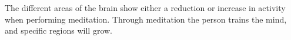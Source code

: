 The different areas of the brain show either a reduction or increase in activity when performing meditation. Through meditation the person trains the mind, and specific regions will grow. \cite{Zeidan2012}


%
